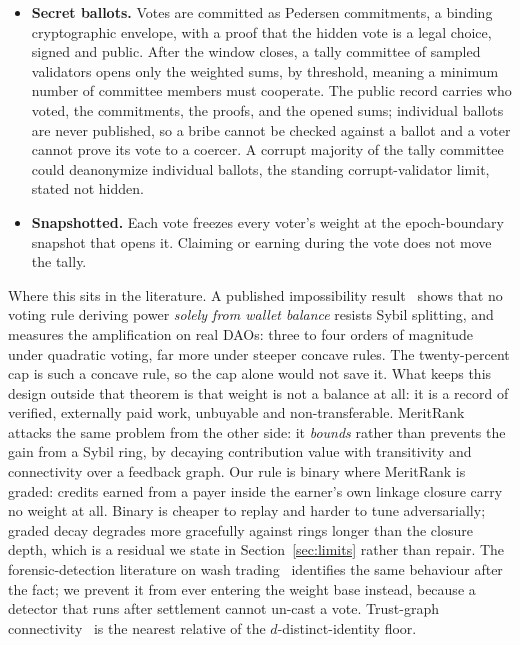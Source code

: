 \documentclass[11pt]{article}
\begin{document}
\begin{itemize}
    \item \textbf{Secret ballots.} Votes are committed as Pedersen
          commitments, a binding cryptographic envelope, with a
          proof that the hidden vote is a legal choice, signed and
          public. After the window closes, a tally committee of sampled
          validators opens only the weighted sums, by threshold, meaning
          a minimum number of committee members must cooperate. The
          public record carries who voted, the commitments, the proofs,
          and the opened sums; individual ballots are never published, so
          a bribe cannot be checked against a ballot and a voter cannot
          prove its vote to a coercer. A corrupt majority of the tally
          committee could deanonymize individual ballots, the standing
          corrupt-validator limit, stated not hidden.
    \item \textbf{Snapshotted.} Each vote freezes every voter's
          weight at the epoch-boundary snapshot that opens it. Claiming
          or earning during the vote does not move the tally.
\end{itemize}

Where this sits in the literature. A published impossibility
result~\cite{concave2026} shows that no voting rule deriving power
\emph{solely from wallet balance} resists Sybil splitting, and
measures the amplification on real DAOs: three to four orders of
magnitude under quadratic voting, far more under steeper concave
rules. The twenty-percent cap is such a concave rule, so the cap
alone would not save it. What keeps this design outside that
theorem is that weight is not a balance at all: it is a record of
verified, externally paid work, unbuyable and non-transferable.
MeritRank~\cite{meritrank2022} attacks the same problem from the
other side: it \emph{bounds} rather than prevents the gain from
a Sybil ring, by decaying contribution value with transitivity and
connectivity over a feedback graph. Our rule is binary where
MeritRank is graded: credits earned from a payer inside the
earner's own linkage closure carry no weight at all. Binary is
cheaper to replay and harder to tune adversarially; graded decay
degrades more gracefully against rings longer than the closure
depth, which is a residual we state in
Section~\ref{sec:limits} rather than repair. The
forensic-detection literature on wash
trading~\cite{washnft2023, washnft2306} identifies the same
behaviour after the fact; we
prevent it from ever entering the weight base instead, because a
detector that runs after settlement cannot un-cast a vote.
Trust-graph connectivity~\cite{poupko2019} is the nearest relative
of the $d$-distinct-identity floor.
\end{document}
